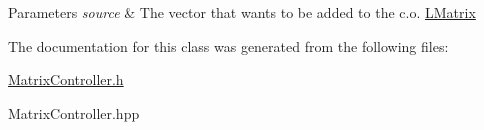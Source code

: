 \begin{DoxyParams}{Parameters}
{\em source} & The vector that wants to be added to the c.\+o. \mbox{\hyperlink{class_l_matrix}{L\+Matrix}} \\
\hline
\end{DoxyParams}


The documentation for this class was generated from the following files\+:\begin{DoxyCompactItemize}
\item 
\mbox{\hyperlink{_matrix_controller_8h}{Matrix\+Controller.\+h}}\item 
Matrix\+Controller.\+hpp\end{DoxyCompactItemize}
